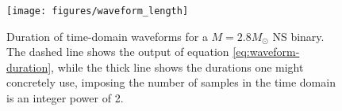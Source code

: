\documentclass[main.tex]{subfiles}
\begin{document}
\begin{figure}[ht]
\centering
\texttt{[image: figures/waveform\_length]}
\caption{Duration of time-domain waveforms for a \(M = 2.8 M_{\odot}\) \ac{NS} binary. The dashed line shows the output of equation \eqref{eq:waveform-duration}, while the thick line shows the durations one might concretely use, imposing the number of samples in the time domain is an integer power of 2.}
\label{fig:waveform_length}
\end{figure}




\end{document}
